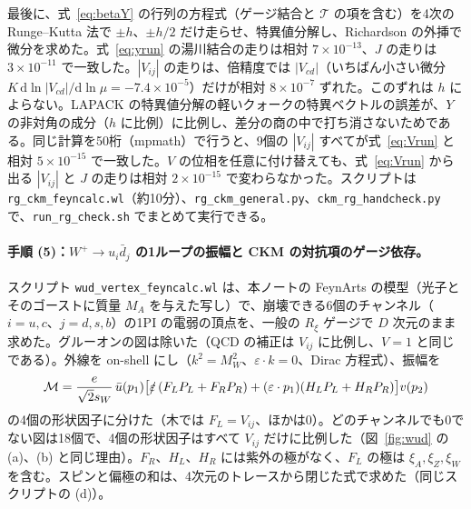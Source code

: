 \documentclass[a4paper,10pt]{ltjsarticle}
\newcommand{\dd}{\mathrm{d}}
\newcommand{\sw}{s_W}
\begin{document}
最後に、式~\eqref{eq:betaY} の行列の方程式（ゲージ結合と $\mathcal T$ の項を含む）を4次の Runge--Kutta 法で $\pm h$、$\pm h/2$ だけ走らせ、特異値分解し、Richardson の外挿で微分を求めた。式~\eqref{eq:yrun} の湯川結合の走りは相対 $7\times10^{-13}$、$J$ の走りは $3\times10^{-11}$ で一致した。$|V_{ij}|$ の走りは、倍精度では $|V_{cd}|$（いちばん小さい微分 $K\,\dd\ln|V_{cd}|/\dd\ln\mu=-7.4\times10^{-5}$）だけが相対 $8\times10^{-7}$ ずれた。このずれは $h$ によらない。LAPACK の特異値分解の軽いクォークの特異ベクトルの誤差が、$Y$ の非対角の成分（$h$ に比例）に比例し、差分の商の中で打ち消さないためである。同じ計算を50桁（mpmath）で行うと、9個の $|V_{ij}|$ すべてが式~\eqref{eq:Vrun} と相対 $5\times10^{-15}$ で一致した。$V$ の位相を任意に付け替えても、式~\eqref{eq:Vrun} から出る $|V_{ij}|$ と $J$ の走りは相対 $2\times10^{-15}$ で変わらなかった。スクリプトは \texttt{rg\_ckm\_feyncalc.wl}（約10分）、\texttt{rg\_ckm\_general.py}、\texttt{ckm\_rg\_handcheck.py} で、\texttt{run\_rg\_check.sh} でまとめて実行できる。

\paragraph{手順 (5)：$W^+\to u_i\bar d_j$ の1ループの振幅と CKM の対抗項のゲージ依存。}スクリプト \texttt{wud\_vertex\_feyncalc.wl} は、本ノートの FeynArts の模型（光子とそのゴーストに質量 $M_A$ を与えた写し）で、崩壊できる6個のチャンネル（$i=u,c$、$j=d,s,b$）の1PI の電弱の頂点を、一般の $R_\xi$ ゲージで $D$ 次元のまま求めた。グルーオンの図は除いた（QCD の補正は $V_{ij}$ に比例し、$V=1$ と同じである）。外線を on-shell にし（$k^2=M_W^2$、$\varepsilon\cdot k=0$、Dirac 方程式）、振幅を
\begin{equation}
\mathcal M=\frac{e}{\sqrt2\sw}\,\bar u(p_1)\bigl[\slashed\varepsilon\,(F_LP_L+F_RP_R)+(\varepsilon\cdot p_1)(H_LP_L+H_RP_R)\bigr]v(p_2)
\label{eq:wudff}
\end{equation}
の4個の形状因子に分けた（木では $F_L=V_{ij}$、ほかは0）。どのチャンネルでも0でない図は18個で、4個の形状因子はすべて $V_{ij}$ だけに比例した（図~\ref{fig:wud} の (a)、(b) と同じ理由）。$F_R$、$H_L$、$H_R$ には紫外の極がなく、$F_L$ の極は $\xi_A,\xi_Z,\xi_W$ を含む。スピンと偏極の和は、4次元のトレースから閉じた式で求めた（同じスクリプトの (d)）。
\end{document}
